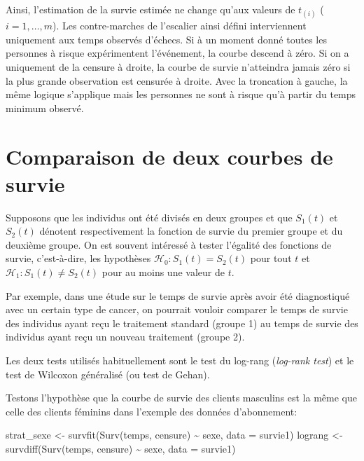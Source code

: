 \documentclass[
  11pt,
  letterpaper,
]{scrbook}
\newenvironment{Shaded}{\begin{snugshade}}{\end{snugshade}}
\newcommand{\AttributeTok}[1]{\textcolor[rgb]{0.40,0.45,0.13}{#1}}
\newcommand{\FunctionTok}[1]{\textcolor[rgb]{0.28,0.35,0.67}{#1}}
\newcommand{\NormalTok}[1]{\textcolor[rgb]{0.00,0.23,0.31}{#1}}
\newcommand{\OtherTok}[1]{\textcolor[rgb]{0.00,0.23,0.31}{#1}}
\newcommand{\SpecialCharTok}[1]{\textcolor[rgb]{0.37,0.37,0.37}{#1}}
\theoremstyle{definition}
\theoremstyle{remark}
\begin{document}
Ainsi, l'estimation de la survie estimée ne change qu'aux valeurs de
\(t_{(i)}\) (\(i=1, \ldots, m\)). Les contre-marches de l'escalier ainsi
défini interviennent uniquement aux temps observés d'échecs. Si à un
moment donné toutes les personnes à risque expérimentent l'événement, la
courbe descend à zéro. Si on a uniquement de la censure à droite, la
courbe de survie n'atteindra jamais zéro si la plus grande observation
est censurée à droite. Avec la troncation à gauche, la même logique
s'applique mais les personnes ne sont à risque qu'à partir du temps
minimum observé.

\hypertarget{comparaison-de-deux-courbes-de-survie}{%
\section{Comparaison de deux courbes de
survie}\label{comparaison-de-deux-courbes-de-survie}}

Supposons que les individus ont été divisés en deux groupes et que
\(S_1(t)\) et \(S_2(t)\) dénotent respectivement la fonction de survie
du premier groupe et du deuxième groupe. On est souvent intéressé à
tester l'égalité des fonctions de survie, c'est-à-dire, les hypothèses
\(\mathscr{H}_0: S_1(t) = S_2(t)\) pour tout \(t\) et
\(\mathscr{H}_1: S_1(t) \neq S_2(t)\) pour au moins une valeur de \(t\).

Par exemple, dans une étude sur le temps de survie après avoir été
diagnostiqué avec un certain type de cancer, on pourrait vouloir
comparer le temps de survie des individus ayant reçu le traitement
standard (groupe 1) au temps de survie des individus ayant reçu un
nouveau traitement (groupe 2).

Les deux tests utilisés habituellement sont le test du log-rang
(\emph{log-rank test}) et le test de Wilcoxon généralisé (ou test de
Gehan).

Testons l'hypothèse que la courbe de survie des clients masculins est la
même que celle des clients féminins dans l'exemple des données
d'abonnement:

\begin{Shaded}
\begin{Highlighting}[]
\NormalTok{strat\_sexe }\OtherTok{\textless{}{-}} \FunctionTok{survfit}\NormalTok{(}\FunctionTok{Surv}\NormalTok{(temps, censure) }\SpecialCharTok{\textasciitilde{}}\NormalTok{ sexe, }\AttributeTok{data =}\NormalTok{ survie1)}
\NormalTok{lograng }\OtherTok{\textless{}{-}} \FunctionTok{survdiff}\NormalTok{(}\FunctionTok{Surv}\NormalTok{(temps, censure) }\SpecialCharTok{\textasciitilde{}}\NormalTok{ sexe, }\AttributeTok{data =}\NormalTok{ survie1)}
\end{Highlighting}
\end{Shaded}
\end{document}
